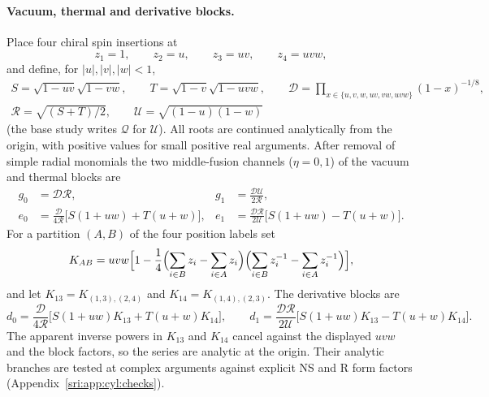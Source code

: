 \paragraph{Vacuum, thermal and derivative blocks.} Place four chiral spin insertions at
\begin{equation}
 z_1=1,\qquad z_2=u,\qquad z_3=uv,\qquad z_4=uvw,
\end{equation}
and define, for $|u|,|v|,|w|<1$,
\begin{equation}
\begin{gathered}
 S=\sqrt{1-uv}\sqrt{1-vw},\qquad T=\sqrt{1-v}\sqrt{1-uvw},\qquad
 \mathcal D=\prod_{x\in\{u,v,w,uv,vw,uvw\}}(1-x)^{-1/8},\\
 \mathcal R=\sqrt{(S+T)/2},\qquad \mathcal U=\sqrt{(1-u)(1-w)}
\end{gathered}
\end{equation}
(the base study writes $\mathcal Q$ for $\mathcal U$). All roots are continued analytically from the origin, with
positive values for small positive real arguments. After removal of simple radial monomials the two middle-fusion
channels ($\eta=0,1$) of the vacuum and thermal blocks are
\begin{equation}
\begin{aligned}
 g_0&=\mathcal D\mathcal R, & g_1&=\frac{\mathcal D\mathcal U}{2\mathcal R},\\
 e_0&=\frac{\mathcal D}{4\mathcal R}\bigl[S(1+uw)+T(u+w)\bigr], &
 e_1&=\frac{\mathcal D\mathcal R}{2\mathcal U}\bigl[S(1+uw)-T(u+w)\bigr].
\end{aligned}
\label{sri:eq:cyl:blocksge}
\end{equation}
For a partition $(A,B)$ of the four position labels set
\begin{equation}
 K_{AB}=uvw\Bigl[1-\frac14\Bigl(\sum_{i\in B}z_i-\sum_{i\in A}z_i\Bigr)\Bigl(\sum_{i\in B}z_i^{-1}-\sum_{i\in A}z_i^{-1}\Bigr)\Bigr],
\end{equation}
and let $K_{13}=K_{(1,3),(2,4)}$ and $K_{14}=K_{(1,4),(2,3)}$. The derivative blocks are
\begin{equation}
 d_0=\frac{\mathcal D}{4\mathcal R}\bigl[S(1+uw)K_{13}+T(u+w)K_{14}\bigr],\qquad
 d_1=\frac{\mathcal D\mathcal R}{2\mathcal U}\bigl[S(1+uw)K_{13}-T(u+w)K_{14}\bigr].
 \label{sri:eq:cyl:blocksd}
\end{equation}
The apparent inverse powers in $K_{13}$ and $K_{14}$ cancel against the displayed $uvw$ and the block factors, so the
series are analytic at the origin. Their analytic branches are tested at complex arguments against explicit NS and R
form factors (Appendix~\ref{sri:app:cyl:checks}).

